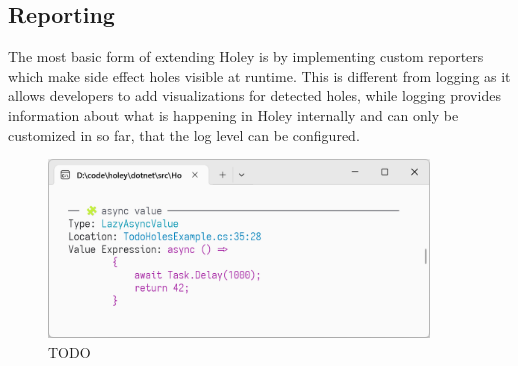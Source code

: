 \subsection{Reporting}
\label{sec:reporting}
The most basic form of extending Holey is by implementing custom reporters which make side effect holes visible at runtime.
This is different from logging as it allows developers to add visualizations for detected holes, while logging provides information about what is happening in Holey internally and can only be customized in so far, that the log level can be configured.

\begin{figure}[ht]
    \centering
    \includegraphics[width=0.9\textwidth]{images/cli-reporting}
    \caption{TODO}
    \label{fig:holey-cli-reporting}
\end{figure}

